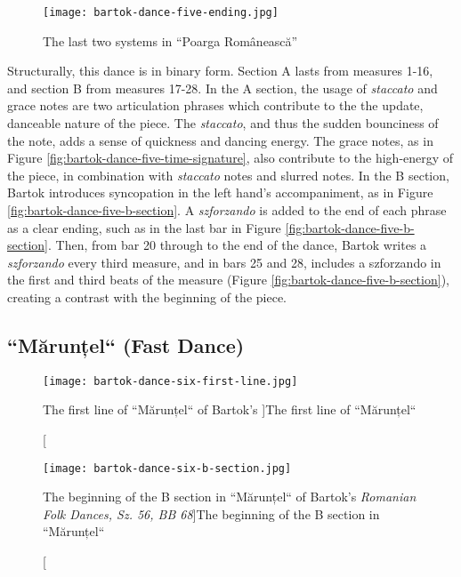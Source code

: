 \begin{figure}
  \centering
  \texttt{[image: bartok-dance-five-ending.jpg]}
  \caption[The last two systems in ``Poarga Românească'' of Bartok's \textit{Romanian Folk Dances, Sz. 56, BB 68}]{The last two systems in ``Poarga Românească''}
  \label{fig:bartok-dance-five-ending}
\end{figure}


Structurally, this dance is in binary form. Section A lasts from measures 1-16, and section B from measures 17-28. In the A section, the usage of \textit{staccato} and grace notes are two articulation phrases which contribute to the the update, danceable nature of the piece. The \textit{staccato}, and thus the sudden bounciness of the note, adds a sense of quickness and dancing energy. The grace notes, as in Figure \ref{fig:bartok-dance-five-time-signature}\autocite{Lung_2016}, also contribute to the high-energy of the piece, in combination with \textit{staccato} notes and slurred notes. In the B section, Bartok introduces syncopation in the left hand's accompaniment, as in Figure \ref{fig:bartok-dance-five-b-section}\autocite{Lung_2016}. A \textit{szforzando} is added to the end of each phrase as a clear ending, such as in the last bar in Figure \ref{fig:bartok-dance-five-b-section}\autocite{Lung_2016}. Then, from bar 20 through to the end of the dance, Bartok writes a \textit{szforzando} every third measure, and in bars 25 and 28, includes a szforzando in the first and third beats of the measure (Figure \ref{fig:bartok-dance-five-b-section}\autocite{Lung_2016}), creating a contrast with the beginning of the piece. 

\subsection{``Mărunțel`` (Fast Dance)}

\begin{figure}
  \centering
  \texttt{[image: bartok-dance-six-first-line.jpg]}
  \caption[The first line of ``Mărunțel`` of Bartok's ]{The first line of ``Mărunțel``}
  \label{fig:bartok-dance-six-first-line}
\end{figure}

\begin{figure}
  \centering
  \texttt{[image: bartok-dance-six-b-section.jpg]}
  \caption[The beginning of the B section in ``Mărunțel`` of Bartok's \textit{Romanian Folk Dances, Sz. 56, BB 68}]{The beginning of the B section in ``Mărunțel``}
  \label{fig:bartok-dance-six-b-section}
\end{figure}

